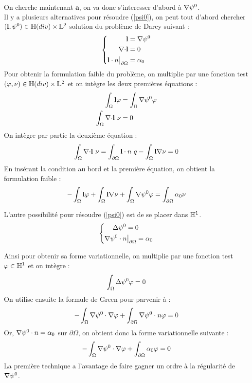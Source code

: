 On cherche maintenant $\mathbf{a}$, on va donc s'interesser d'abord à ${\nabla}\psi^0$.\\
Il y a plusieurs alternatives pour résoudre (\ref{psi0}), on peut tout d'abord chercher $(\mathbf{l},\psi^0)\in{\mathbb{H}}(div)\times{\mathbb{L}}^2$ solution du problème de Darcy suivant :
\begin{equation}
\label{pbpsidiv}
\left\{
\begin{aligned}
\mathbf{l} &= {\nabla} \psi^0\\
{\nabla\cdot} \mathbf{l} &= 0\\
\mathbf{l}\cdot n{\big\rvert_{\partial\Omega}} &= \alpha_0
\end{aligned}
\right.
\end{equation}
Pour obtenir la formulation faible du problème, on multiplie par une fonction test $(\varphi,\nu)\in{\mathbb{H}}(div)\times{\mathbb{L}}^2$ et on intègre les deux premières équations :
\begin{align*}
\int_\Omega \mathbf{l}\varphi &= \int_\Omega {\nabla}\psi^0\varphi\\
\int_\Omega {\nabla\cdot} \mathbf{l}\ \nu &= 0
\end{align*}
On intègre par partie la deuxième équation :
\[
\int_\Omega {\nabla\cdot} \mathbf{l}\ \nu = \int_{\partial\Omega} \mathbf{l}\cdot n\ q - \int_\Omega \mathbf{l}{\nabla}\nu = 0 
\]
En insérant la condition au bord et la première équation, on obtient la formulation faible :
\begin{equation}
\label{fvpsidiv}
-\int_\Omega \mathbf{l}\varphi + \int_\Omega \mathbf{l}{\nabla}\nu + \int_\Omega {\nabla}\psi^0\varphi  = \int_{\partial\Omega} \alpha_0\nu
\end{equation}

L'autre possibilité pour résoudre (\ref{psi0}) est de se placer dans ${\mathbb{H}}^1$. 
\begin{equation}
\label{pbpsi0}
\left\{
\begin{aligned}
&-{\Delta}\psi^0 = 0\\
&{\nabla}\psi^0\cdot n{\big\rvert_{\partial\Omega}}=\alpha_0
\end{aligned}
\right.
\end{equation}

Ainsi pour obtenir sa forme variationnelle, on multiplie par une fonction test $\varphi\in{\mathbb{H}}^1$ et on intègre :
\[
\int_\Omega {\Delta}\psi^0 \varphi = 0
\]
On utilise ensuite la formule de Green pour parvenir à :
\[
-\int_\Omega {\nabla}\psi^0\cdot{\nabla}\varphi + \int_{\partial\Omega} {\nabla}\psi^0\cdot n\varphi = 0
\]
Or, ${\nabla}\psi^0\cdot n = \alpha_0$ sur $\partial\Omega$, on obtient donc la forme variationnelle suivante :
\begin{equation}
\label{fvpsi0}
-\int_\Omega {\nabla}\psi^0\cdot{\nabla}\varphi + \int_{\partial\Omega} \alpha_0\varphi = 0
\end{equation}
La première technique a l'avantage de faire gagner un ordre à la régularité de ${\nabla}\psi^0$.\\

